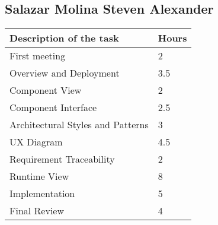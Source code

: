 \subsection{Salazar Molina Steven Alexander}
\begin{center}
\renewcommand{\arraystretch}{1.5}
\begin{tabular}{ |m{7cm}|m{2cm}| } 
 \hline
 \textbf{Description of the task}  & \textbf{Hours} \\
 \hline
 First meeting & 2 \\
 \hline
 Overview and Deployment & 3.5 \\
 \hline
 Component View & 2\\ 
 \hline
 Component Interface &  2.5 \\
 \hline
 Architectural Styles and Patterns & 3 \\ 
 \hline 
 UX Diagram &  4.5 \\
 \hline
 Requirement Traceability & 2 \\ 
 \hline
 Runtime View & 8 \\
 \hline
 Implementation & 5 \\
 \hline
 Final Review &  4 \\
 \hline
\end{tabular}
\end{center}
